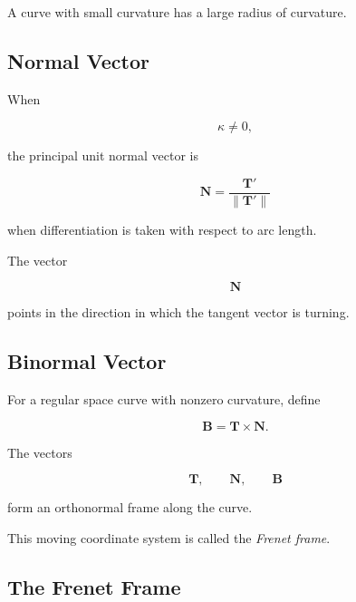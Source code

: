 A curve with small curvature has a large radius of curvature.

\subsection{Normal Vector}
\label{subsec:principal-normal-vector}

When

\[
\kappa\neq0,
\]

the principal unit normal vector is

\[
\boxed{
\mathbf{N}
=
\frac{\mathbf{T}'}
{\|\mathbf{T}'\|}
}
\]

when differentiation is taken with respect to arc length.

The vector

\[
\mathbf{N}
\]

points in the direction in which the tangent vector is turning.

\subsection{Binormal Vector}
\label{subsec:binormal-vector}

For a regular space curve with nonzero curvature, define

\[
\boxed{
\mathbf{B}
=
\mathbf{T}\times\mathbf{N}.
}
\]

The vectors

\[
\mathbf{T},
\qquad
\mathbf{N},
\qquad
\mathbf{B}
\]

form an orthonormal frame along the curve.

This moving coordinate system is called the \emph{Frenet frame}.

\subsection{The Frenet Frame}
\label{subsec:frenet-frame}

\begin{centereddiagram}
\end{centereddiagram}

